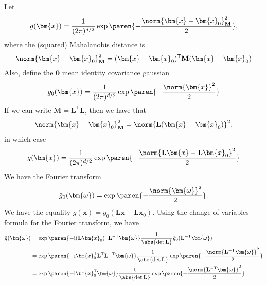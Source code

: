 Let
\[
    g(\bm{x}) = \frac{1}{(2\pi)^{d/2}} \exp\paren{-\frac{\norm{\bm{x} - \bm{x}_0}_\mathbf{M}^2}{2}},
\]
where the (squared) Mahalanobis distance is
\[
    \norm{\bm{x} - \bm{x}_0}_\mathbf{M}^2 = (\bm{x} - \bm{x}_0)^\mathsf{T}\mathbf{M}(\bm{x} - \bm{x}_0)
\]
Also, define the $\bm{0}$ mean identity covariance gaussian
\[
    g_0(\bm{x}) = \frac{1}{(2\pi)^{d/2}} \exp\paren{-\frac{\norm{\bm{x}}^2}{2}}
\]
If we can write $\mathbf{M} = \mathbf{L}^\mathsf{T}\mathbf{L}$, then we have that
\[
\norm{\bm{x} - \bm{x}_0}_\mathbf{M}^2 = \norm{\mathbf{L}(\bm{x} - \bm{x}_0)}^2,
\]
in which case
\[
g(\bm{x}) = \frac{1}{(2\pi)^{d/2}} \exp\paren{-\frac{\norm{\mathbf{L}\bm{x} - \mathbf{L}\bm{x}_0}^2}{2}}
\]
We have the Fourier transform
\[
    \hat{g}_0(\bm{\omega}) = \exp\paren{-\frac{\norm{\bm{\omega}}^2}{2}}.
\]
We have the equality $g(\bm{x}) = g_0(\mathbf{L}\bm{x} - \mathbf{L}\bm{x}_0)$. Using the change of variables formula for the Fourier transform, we have
\begin{align*}
    \hat{g}(\bm{\omega})
    &= \exp\paren{-\mathrm{i}(\mathbf{L}\bm{x}_0)^\mathsf{T}\mathbf{L}^{-\mathsf{T}}\bm{\omega}} \frac{1}{\abs{\det \mathbf{L}}} \hat{g}_0(\mathbf{L}^{-\mathsf{T}} \bm{\omega}) \\
    &= \exp\paren{-\mathrm{i}\bm{x}_0^\mathsf{T}\mathbf{L}^\mathsf{T}\mathbf{L}^{-\mathsf{T}}\bm{\omega}} \frac{1}{\abs{\det \mathbf{L}}} \exp\paren{-\frac{\norm{\mathbf{L}^{-\mathsf{T}} \bm{\omega}}^2}{2}} \\
    &= \exp\paren{-\mathrm{i}\bm{x}_0^\mathsf{T}\bm{\omega}} \frac{1}{\abs{\det \mathbf{L}}} \exp\paren{-\frac{\norm{\mathbf{L}^{-\mathsf{T}} \bm{\omega}}^2}{2}}
\end{align*}

